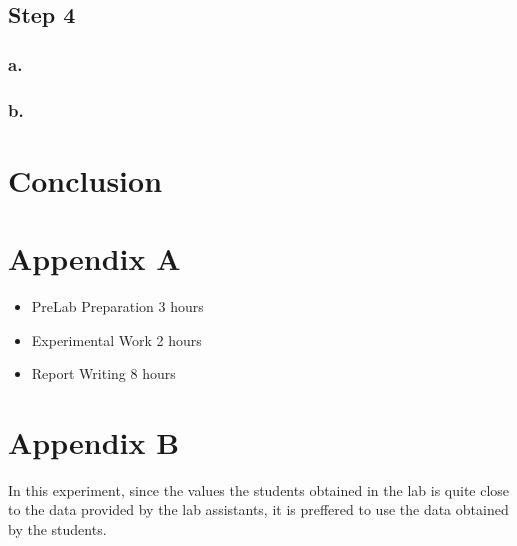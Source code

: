 \documentclass[letterpaper,12pt]{article}
\begin{document}
\subsection{Step 4}
\subsubsection{a.}

\subsubsection{b.}


\section{Conclusion}



\section*{Appendix A}
\begin{itemize}
    \item PreLab Preparation 3 hours
    \item Experimental Work 2  hours
    \item Report Writing 8 hours
\end{itemize}
\section*{Appendix B}
In this experiment, since the values the students obtained in the lab is quite close to the data provided by the lab assistants, it is preffered to use the data obtained by the students.
\end{document}
